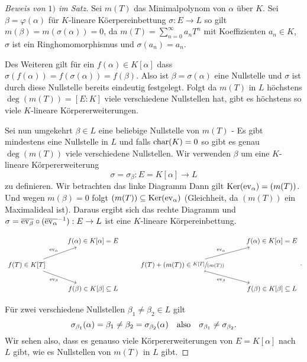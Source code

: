 \begin{proof}[Beweis von $1)$ im Satz]
	Sei $m(T)$ das Minimalpolynom von $\alpha$ über $K$. Sei $\beta = \varphi(\alpha)$ für $K$-lineare Köerpereinbettung
	$\sigma: E \to L$ so gilt $m(\beta) = m(\sigma(\alpha)) = 0$, da $m(T) = \sum_{n=0}^{\infty} a_{n} T^{n}$ mit Koeffizienten $a_{n} \in K$, $\sigma$ ist ein Ringhomomorphismus
	und $\sigma(a_{n}) = a_{n}$.

	Des Weiteren gilt für ein $f(\alpha) \in K[\alpha]$ dass $\sigma(f(\alpha)) = f(\sigma(\alpha)) = f(\beta)$.
	Also ist $\beta = \sigma(\alpha)$ eine Nullstelle und $\sigma$ ist durch diese Nullstelle bereits eindeutig festgelegt.
	Folgt da $m(T)$ in $L$ höchstens $\deg(m(T)) = [E:K]$ viele verschiedene Nullstellen hat,
	gibt es höchstens so viele $K$-lineare Körpererweiterungen.

	Sei nun umgekehrt $\beta \in L$ eine beliebige Nullstelle von $m(T)$ - Es gibt mindestens eine Nullstelle in $L$ und falls
	$\operatorname{char}(K)=0$ so gibt es genau $\deg(m(T))$ viele verschiedene Nullstellen.
	Wir verwenden $\beta$ um eine $K$-lineare Körpererweiterung
	\[
		\sigma = \sigma_{\beta}: E = K[\alpha] \to L
	\] 
	zu definieren. Wir betrachten das linke Diagramm
	Dann gilt $\operatorname{Ker}(\operatorname{ev}_{\alpha}) = (m(T))$. Und wegen $m(\beta) = 0$ folgt $(m(T)) \subseteq \operatorname{Ker}(\operatorname{ev}_{\alpha})$ 
	(Gleichheit, da $(m(T))$ ein Maximalideal ist).
	Daraus ergibt sich das rechte Diagramm
	und $\sigma = \overline{\operatorname{ev}_{\beta}} \circ (\overline{\operatorname{ev}_{\alpha}}^{-1}) : E \to L$ ist eine $K$-lineare Körpereinbettung.
	
	\[
		\begin{tikzcd}
			& f(\alpha) \in K[\alpha] = E & & f(\alpha) \in K[\alpha] = E \\
			{f(T) \in K[T]} \arrow[ru, "\ev_\alpha"] \arrow[rd, "\ev_\beta"'] & & {f(T) + (m(T)) \in \sfrac{K[T]}{(m(T))}} \arrow[ru, "\ev_\alpha"] \arrow[rd, "\ev_\beta"', maps to] & \\
			 & f(\beta) \in K[\beta] \subseteq L & & f(\beta) \in K[\beta] \subseteq L
		\end{tikzcd}
	.\]
	
	Für zwei verschiedene Nullstellen $\beta_{1} \neq \beta_{2} \in L$ gilt
	\[
		\sigma_{\beta_1}(\alpha) = \beta_1 \neq  \beta_2 = \sigma_{\beta_2}(\alpha) \qq{also} \sigma_{\beta_1} \neq  \sigma_{\beta_2}
	.\] 
	Wir sehen also, dass es genauso viele Körpererweiterungen von $E = K[\alpha]$ nach $L$ gibt, wie es Nullstellen von $m(T)$ in $L$ gibt.
\end{proof}

